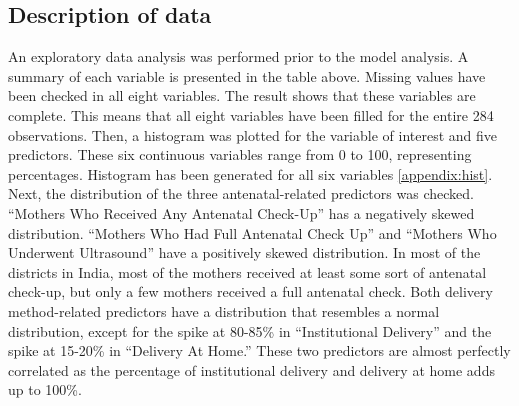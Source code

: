 \documentclass{article}
\begin{document}
\subsection{Description of data}
\begin{table}[!ht]
\centering
{}
\caption{Summary of variables}
\end{table}
\noindent An exploratory data analysis was performed prior to the model analysis. A summary of each variable is presented in the table above. Missing values have been checked in all eight variables. The result shows that these variables are complete. This means that all eight variables have been filled for the entire 284 observations. Then, a histogram was plotted for the variable of interest and five predictors. These six continuous variables range from 0 to 100, representing percentages. Histogram has been generated for all six variables \ref{appendix:hist}. Next, the distribution of the three antenatal-related predictors was checked. ``Mothers Who Received Any Antenatal Check-Up'' has a negatively skewed distribution. ``Mothers Who Had Full Antenatal Check Up'' and ``Mothers Who Underwent Ultrasound'' have a positively skewed distribution. In most of the districts in India, most of the mothers received at least some sort of antenatal check-up, but only a few mothers received a full antenatal check. Both delivery method-related predictors have a distribution that resembles a normal distribution, except for the spike at 80-85\% in ``Institutional Delivery'' and the spike at 15-20\% in ``Delivery At Home.'' These two predictors are almost perfectly correlated as the percentage of institutional delivery and delivery at home adds up to 100\%.
\end{document}
